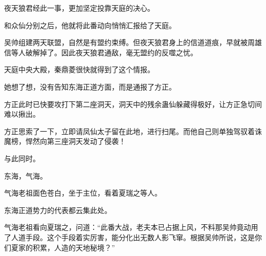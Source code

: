 \begin{this_body}
夜天狼君经此一事，更加坚定投靠天庭的决心。

和众仙分别之后，他就将此番动向悄悄汇报给了天庭。

吴帅组建两天联盟，自然是有盟约束缚。但夜天狼君身上的信道道痕，早就被周雄信等人破解掉了。因此夜天狼君通敌，毫无盟约的反噬之忧。

天庭中央大殿，秦鼎菱很快就得到了这个情报。

她想了想，没有告知东海正道方面，而是通报了方正。

方正此时已快要攻打下第二座洞天，洞天中的残余蛊仙躲藏得极好，让方正急切间难以揪出。

方正思索了一下，立即请凤仙太子留在此地，进行扫尾。而他自己则单独驾驭着诛魔榜，悍然向第三座洞天发动了侵袭！

与此同时。

东海，气海。

气海老祖面色苍白，坐于主位，看着夏瑞之等人。

东海正道势力的代表都云集此处。

气海老祖看向夏瑞之，问道：“此番大战，老夫本已占据上风，不料那吴帅竟动用了人道手段。这个手段着实厉害，能分化出无数人影飞窜。根据吴帅所说，这是你们夏家的积累，人造的天地秘境？”

\end{this_body}

